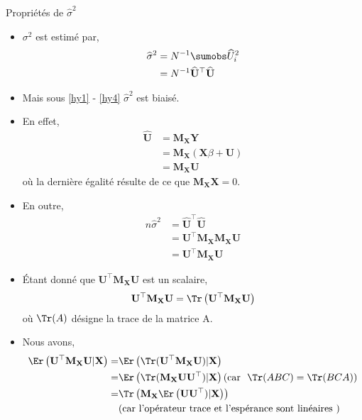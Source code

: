 \begin{frame}[allowframebreaks]{Propriétés de $\widehat{\sigma}^2$}
\begin{itemize}
\item $\sigma^2$ est estimé par,
\begin{align*}
\widehat{\sigma}^2
&= N^{-1}\sumobs \widehat{U}_i^2\\
& =  N^{-1}\widehat{\mathbf{U}}^\top\widehat{\mathbf{U}}
\end{align*}
\item Mais sous \ref{hy1} - \ref{hy4} $\widehat{\sigma}^2$ est  biaisé. 
\item En effet,
\begin{align*}
\widehat{\mathbf{U}} &= \mathbf{M}_\mathbf{X}\mathbf{Y}\\
& = \mathbf{M}_\mathbf{X}(\mathbf{X}\beta + \mathbf{U})\\
& = \mathbf{M}_\mathbf{X}\mathbf{U}
\end{align*}
où la dernière égalité résulte de ce que $\mathbf{M}_\mathbf{X}\mathbf{X} = 0$. 
\item En outre,
\begin{align*}
n\widehat{\sigma}^2 &= \widehat{\mathbf{U}}^\top\widehat{\mathbf{U}}\\
& = \mathbf{U}^\top\mathbf{M}_\mathbf{X}\mathbf{M}_\mathbf{X}\mathbf{U} \\
&= \mathbf{U}^\top\mathbf{M}_\mathbf{X}\mathbf{U}
\end{align*}
\item \'Etant donné que $\mathbf{U}^\top\mathbf{M}_\mathbf{X}\mathbf{U}$ est un scalaire,
\begin{align*}
\mathbf{U}^\top\mathbf{M}_\mathbf{X}\mathbf{U} = \Tr\left(\mathbf{U}^\top\mathbf{M}_\mathbf{X}\mathbf{U}\right)
\end{align*}
où $\Tr(A)$ désigne la trace de la matrice A.
\item  Nous avons,
\begin{align*}
\Er\left(\mathbf{U}^\top\mathbf{M}_\mathbf{X}\mathbf{U}|\mathbf{X}\right) =&  \Er\left(\Tr(\mathbf{U}^\top\mathbf{M}_\mathbf{X}\mathbf{U})|\mathbf{X}\right)\\
=&\Er\left(\Tr(\mathbf{M}_\mathbf{X}\mathbf{U}\mathbf{U}^\top)|\mathbf{X}\right)(\textrm{car \ } \Tr(ABC) = \Tr(BCA))\\
=&\Tr\left(\mathbf{M}_\mathbf{X}\Er\left(\mathbf{U}\mathbf{U}^\top)|\mathbf{X}\right)\right)\\
&(\textrm{car l'opérateur trace et l'espérance sont linéaires })\\

\end{align*}
\end{itemize}
\end{frame}
